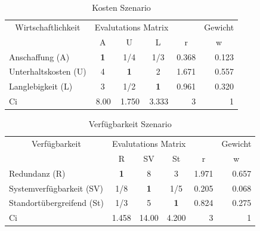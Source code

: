 \begin{table}[htbp]
\caption{Kosten Szenario}
\begin{tabular}{|l|c|c|c|r|r|}
\hline
\multicolumn{ 1}{|c|}{Wirtschaftlichkeit} & \multicolumn{ 3}{c|}{Evalutations Matrix} & \multicolumn{1}{l|}{} & \multicolumn{1}{l|}{Gewicht} \\ \cline{ 2- 6}
\multicolumn{ 1}{|c|}{} & A & U & L & \multicolumn{1}{c|}{r} & \multicolumn{1}{c|}{w} \\ \hline
Anschaffung (A) & \textbf{1} &  1/4 &  1/3 & 0.368 & 0.123 \\ \hline
Unterhaltskosten (U)  & 4 & \textbf{1} & 2 & 1.671 & 0.557 \\ \hline
Langlebigkeit (L) & 3 &  1/2 & \textbf{1} & 0.961 & 0.320 \\ \hline \hline 
Ci & \multicolumn{1}{r|}{8.00} & \multicolumn{1}{r|}{1.750} & \multicolumn{1}{r|}{3.333} & 3 & 1 \\ \hline
\end{tabular}
\label{AHPKostenS}
\end{table}

\begin{table}[htbp]
\caption{Verfügbarkeit Szenario}
\begin{tabular}{|p{7.1cm}|c|c|c|r|r|}
\hline
\multicolumn{ 1}{|c|}{Verfügbarkeit} & \multicolumn{ 3}{c|}{Evalutations Matrix} & \multicolumn{1}{l|}{} & \multicolumn{1}{l|}{Gewicht} \\ \cline{ 2- 6}
\multicolumn{ 1}{|c|}{} & R & SV & St & \multicolumn{1}{c|}{r} & \multicolumn{1}{c|}{w} \\ \hline
Redundanz (R) & \textbf{1    } & 8     & 3     & 1.971 & 0.657 \\ \hline
Systemverfügbarkeit (SV) &  1/8 & \textbf{1} &  1/5 & 0.205 & 0.068 \\ \hline
Standortübergreifend (St) &  1/3 & 5     & \textbf{1} & 0.824 & 0.275 \\ \hline \hline
Ci & \multicolumn{1}{r|}{1.458} & \multicolumn{1}{r|}{14.00} & \multicolumn{1}{r|}{4.200} & 3 & 1 \\ \hline
\end{tabular}
\label{AHPVerfügbarkeitS}
\end{table}


